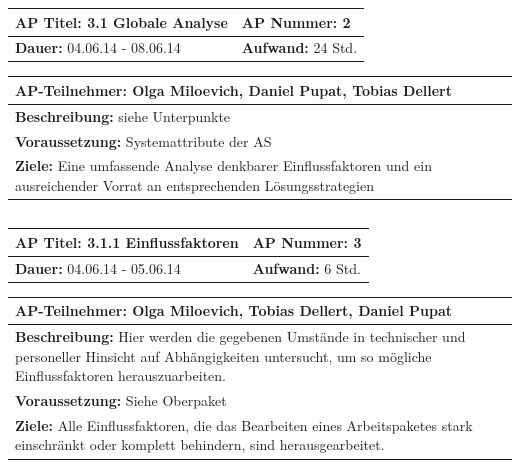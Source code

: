 \documentclass[fontsize=12pt,paper=a4,twoside]{scrartcl}
\begin{document}
\begin{tabular}{|p{7.43cm}|p{7.43cm}|}
\hline
\textbf{AP Titel: } 3.1 Globale Analyse & \textbf{AP Nummer: }2\\ 
\hline
\textbf{Dauer: }04.06.14 - 08.06.14& \textbf{Aufwand: }24 Std.\\
\hline
\end{tabular}
\begin{tabular}{|p{15.3cm}|}
\hline
\textbf{AP-Teilnehmer: }Olga Miloevich, Daniel Pupat, Tobias Dellert\\
\hline
\textbf{Beschreibung: }siehe Unterpunkte\\
\hline
\textbf{Voraussetzung: }Systemattribute der AS\\
\hline 
\textbf{Ziele: }Eine umfassende Analyse denkbarer Einflussfaktoren und ein ausreichender Vorrat an entsprechenden Lösungsstrategien\\
\hline 
\end{tabular}
\begin{verbatim}

\end{verbatim}

\begin{tabular}{|p{7.43cm}|p{7.43cm}|}
\hline
\textbf{AP Titel: }3.1.1 Einflussfaktoren & \textbf{AP Nummer: }3\\ 
\hline
\textbf{Dauer: }04.06.14 - 05.06.14& \textbf{Aufwand: }6 Std.\\
\hline
\end{tabular}
\begin{tabular}{|p{15.3cm}|}
\hline
\textbf{AP-Teilnehmer: }Olga Miloevich, Tobias Dellert, Daniel Pupat\\
\hline
\textbf{Beschreibung: }Hier werden die gegebenen Umstände in technischer und personeller Hinsicht auf Abhängigkeiten untersucht, um so mögliche Einflussfaktoren herauszuarbeiten.\\
\hline
\textbf{Voraussetzung: }Siehe Oberpaket\\
\hline 
\textbf{Ziele: }Alle Einflussfaktoren, die das Bearbeiten eines Arbeitspaketes stark einschränkt oder komplett behindern, sind herausgearbeitet.  \\
\hline 
\end{tabular}
\begin{verbatim}

\end{verbatim}
\end{document}
